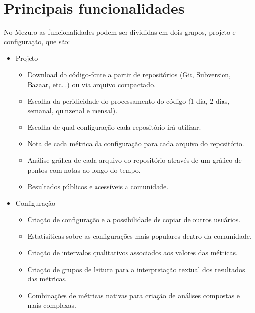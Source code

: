 \documentclass[12pt]{article}
\begin{document}
\section{Principais funcionalidades}\label{sec:princ-funcionalidades}
No Mezuro as funcionalidades podem ser divididas em dois grupos, projeto e configuração, que são:
\begin{itemize}
  \item Projeto
    \begin{itemize}
    \item Download do código-fonte a partir de repositórios (Git, Subversion, Bazaar, etc...) ou via arquivo compactado.
        \item Escolha da peridicidade do processamento do código (1 dia, 2 dias, semanal, quinzenal e mensal).
        \item Escolha de qual configuração cada repositório irá utilizar.
        \item Nota de cada métrica da configuração para cada arquivo do repositório.
        \item Análise gráfica de cada arquivo do repositório através de um gráfico de pontos com notas ao longo do tempo.
        \item Resultados públicos e acessíveis a comunidade.
    \end{itemize}
    \item Configuração
    \begin{itemize}
    \item Criação de configuração e a possibilidade de copiar de outros usuários.
        \item Estatísiticas sobre as configurações mais populares dentro da comunidade.
        \item Criação de intervalos qualitativos associados aos valores das métricas.
        \item Criação de grupos de leitura para a interpretação textual dos resultados das métricas.
        \item Combinações de métricas nativas para criação de análises compostas e mais complexas.
    \end{itemize}
\end{itemize}
\newpage


\end{document}

